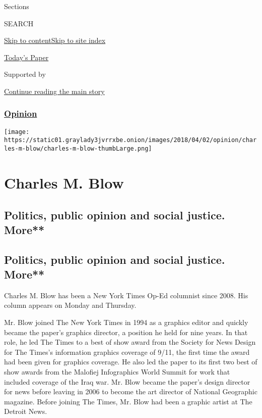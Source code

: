 Sections

SEARCH

\protect\hyperlink{site-content}{Skip to
content}\protect\hyperlink{site-index}{Skip to site index}

\href{https://myaccount.nytimes3xbfgragh.onion/auth/login?response_type=cookie\&client_id=vi}{}

\href{https://www.nytimes3xbfgragh.onion/section/todayspaper}{Today's
Paper}

Supported by

\protect\hyperlink{after-sponsor}{Continue reading the main story}

\hypertarget{opinion}{%
\subsubsection{\texorpdfstring{\href{/section/opinion}{Opinion}}{Opinion}}\label{opinion}}

\texttt{[image: https://static01.graylady3jvrrxbe.onion/images/2018/04/02/opinion/charles-m-blow/charles-m-blow-thumbLarge.png]}

\hypertarget{charles-m-blow}{%
\section{Charles M. Blow}\label{charles-m-blow}}

\hypertarget{politics-public-opinion-and-social-justice-more}{%
\subsection{Politics, public opinion and social justice.
More**}\label{politics-public-opinion-and-social-justice-more}}

\hypertarget{politics-public-opinion-and-social-justice-more-1}{%
\subsection{Politics, public opinion and social justice.
More**}\label{politics-public-opinion-and-social-justice-more-1}}

Charles M. Blow has been a New York Times Op-Ed columnist since 2008.
His column appears on Monday and Thursday.

Mr. Blow joined The New York Times in 1994 as a graphics editor and
quickly became the paper's graphics director, a position he held for
nine years. In that role, he led The Times to a best of show award from
the Society for News Design for The Times's information graphics
coverage of 9/11, the first time the award had been given for graphics
coverage. He also led the paper to its first two best of show awards
from the Malofiej Infographics World Summit for work that included
coverage of the Iraq war. Mr. Blow became the paper's design director
for news before leaving in 2006 to become the art director of National
Geographic magazine. Before joining The Times, Mr. Blow had been a
graphic artist at The Detroit News.

